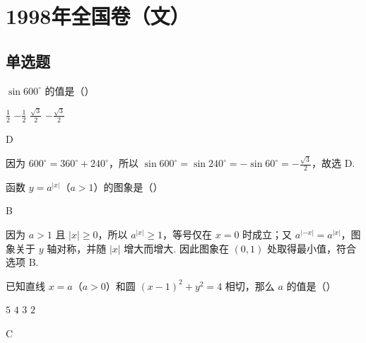 \chapter{1998年全国卷（文）}
\section{单选题}

\begin{problem}
\(\sin 600^{\circ}\) 的值是（\quad）

\choices
    {\(\frac{1}{2}\)}
    {\(-\frac{1}{2}\)}
    {\(\frac{\sqrt{3}}{2}\)}
    {\(-\frac{\sqrt{3}}{2}\)}
\end{problem}

\begin{answer}
D
\end{answer}

\begin{solution}
因为 \(600^{\circ}=360^{\circ}+240^{\circ}\)，所以
\(\sin 600^{\circ}=\sin 240^{\circ}=-\sin 60^{\circ}=-\frac{\sqrt{3}}{2}\)，故选 D.
\end{solution}

\begin{problem}
函数 \(y=a^{|x|}\)（\(a>1\)）的图象是（\quad）

    {}
    {}
    {}
\end{problem}

\begin{answer}
B
\end{answer}

\begin{solution}
因为 \(a>1\) 且 \(|x|\geqslant0\)，所以 \(a^{|x|}\geqslant1\)，等号仅在 \(x=0\) 时成立；又 \(a^{|-x|}=a^{|x|}\)，图象关于 \(y\) 轴对称，并随 \(|x|\) 增大而增大. 因此图象在 \((0,1)\) 处取得最小值，符合选项 B.
\end{solution}

\begin{problem}
已知直线 \(x=a\)（\(a>0\)）和圆 \((x - 1)^2 + y^2 = 4\) 相切，那么 \(a\) 的值是（\quad）

\choices
    {\(5\)}
    {\(4\)}
    {\(3\)}
    {\(2\)}
\end{problem}

\begin{answer}
C
\end{answer}

